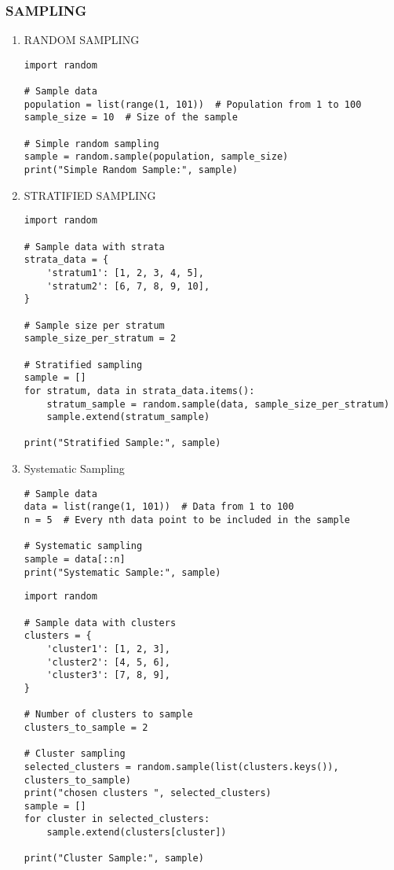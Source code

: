 \documentclass[11pt]{article}
\begin{document}
\subsubsection{SAMPLING}
\label{sec:org19694b4}
\begin{enumerate}
\item RANDOM SAMPLING
\label{sec:org116888e}
\begin{verbatim}
import random

# Sample data
population = list(range(1, 101))  # Population from 1 to 100
sample_size = 10  # Size of the sample

# Simple random sampling
sample = random.sample(population, sample_size)
print("Simple Random Sample:", sample)
\end{verbatim}
\item STRATIFIED SAMPLING
\label{sec:org326853d}
\begin{verbatim}
import random

# Sample data with strata
strata_data = {
    'stratum1': [1, 2, 3, 4, 5],
    'stratum2': [6, 7, 8, 9, 10],
}

# Sample size per stratum
sample_size_per_stratum = 2

# Stratified sampling
sample = []
for stratum, data in strata_data.items():
    stratum_sample = random.sample(data, sample_size_per_stratum)
    sample.extend(stratum_sample)

print("Stratified Sample:", sample)
\end{verbatim}
\item Systematic Sampling
\label{sec:org11fe5b8}
\begin{verbatim}
# Sample data
data = list(range(1, 101))  # Data from 1 to 100
n = 5  # Every nth data point to be included in the sample

# Systematic sampling
sample = data[::n]
print("Systematic Sample:", sample)
\end{verbatim}


\begin{verbatim}
import random

# Sample data with clusters
clusters = {
    'cluster1': [1, 2, 3],
    'cluster2': [4, 5, 6],
    'cluster3': [7, 8, 9],
}

# Number of clusters to sample
clusters_to_sample = 2

# Cluster sampling
selected_clusters = random.sample(list(clusters.keys()), clusters_to_sample)
print("chosen clusters ", selected_clusters)
sample = []
for cluster in selected_clusters:
    sample.extend(clusters[cluster])

print("Cluster Sample:", sample)
\end{verbatim}
\end{enumerate}
\end{document}
